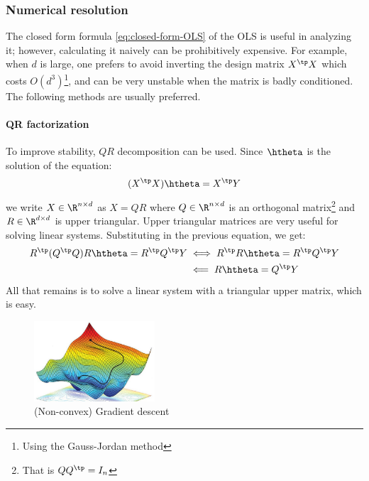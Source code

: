\documentclass{../cs-classes/cs-classes}
\begin{document}
\subsubsection{Numerical resolution}
The closed form formula \eqref{eq:closed-form-OLS} of the OLS is useful in analyzing it; however, calculating it naively can be prohibitively expensive. For example, when $d$ is large, one prefers to avoid inverting the design matrix $X^\tp X$ which costs $O(d^3)$\footnote{Using the Gauss-Jordan method}, and can be very unstable when the matrix is badly conditioned. The following methods are usually preferred.

\paragraph*{QR factorization}
To improve stability, $QR$ decomposition can be used. Since $\htheta$ is the solution of the equation:
\begin{equation*}
    (X^\tp X)\htheta = X^\tp Y
\end{equation*}
we write $X\in\R^{n\times d}$ as $X=QR$ where $Q\in\R^{n\times d}$ is an orthogonal matrix\footnote{That is $QQ^\tp=I_n$} and $R\in\R^{d\times d}$ is upper triangular. Upper triangular matrices are very useful for solving linear systems. Substituting in the previous equation, we get:
\begin{equation*}
    \begin{aligned}
        R^\tp(Q^\tp Q)R\htheta = R^\tp Q^\tp Y &\iff R^\tp R\htheta = R^\tp Q^\tp Y \\
        &\impliedby R\htheta = Q^\tp Y
    \end{aligned}
\end{equation*}
All that remains is to solve a linear system with a triangular upper matrix, which is easy.

\begin{figure}
    \centering
    \includegraphics[width=0.4\textwidth]{images/gradient-descent.jpg}
    \caption{(Non-convex) Gradient descent}
\end{figure}
\end{document}
